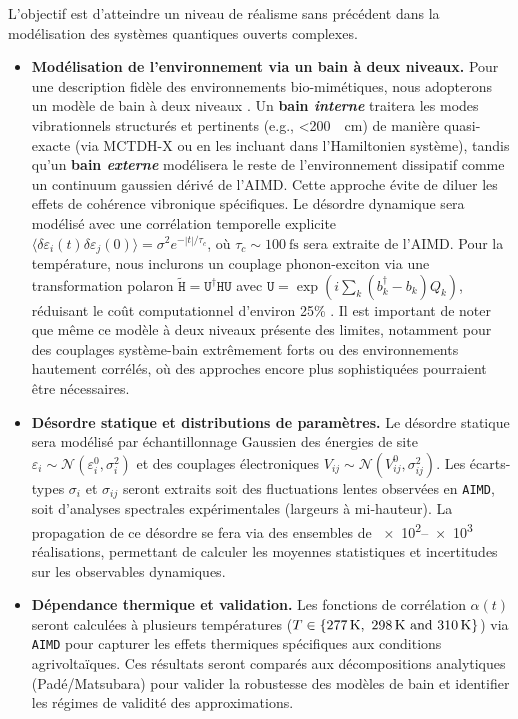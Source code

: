 \documentclass[12pt, a4paper]{article}
\begin{document}
L'objectif est d'atteindre un niveau de réalisme sans précédent dans la modélisation des systèmes quantiques ouverts complexes.
\begin{itemize}
    \item \textbf{Modélisation de l'environnement via un bain à deux niveaux.} Pour une description fidèle des environnements bio-mimétiques, nous adopterons un modèle de bain à deux niveaux \cite{Bai2024}. Un \textbf{bain \textit{interne}} traitera les modes vibrationnels structurés et pertinents (e.g., \SI{<200}{\per\centi\meter}) de manière quasi-exacte (via MCTDH-X ou en les incluant dans l'Hamiltonien système), tandis qu'un \textbf{bain \textit{externe}} modélisera le reste de l'environnement dissipatif comme un continuum gaussien dérivé de l'AIMD. Cette approche évite de diluer les effets de cohérence vibronique spécifiques. Le désordre dynamique sera modélisé avec une corrélation temporelle explicite $\langle \delta \varepsilon_i(t) \delta \varepsilon_j(0) \rangle = \sigma^2 e^{-|t|/\tau_c}$, où $\tau_c \sim \SI{100}{\femto\second}$ sera extraite de l'AIMD. Pour la température, nous inclurons un couplage phonon-exciton via une transformation polaron $\tilde{\mathtt{H}} = \mathtt{U}^\dagger \mathtt{H}\mathtt{U}$ avec $\mathtt{U} = \exp(i \sum_k (b_k^\dagger - b_k) Q_k)$, réduisant le coût computationnel d'environ 25\% \cite{Link2024}. Il est important de noter que même ce modèle à deux niveaux présente des limites, notamment pour des couplages système-bain extrêmement forts ou des environnements hautement corrélés, où des approches encore plus sophistiquées pourraient être nécessaires.
    
    \item \textbf{Désordre statique et distributions de paramètres.} Le désordre statique sera modélisé par échantillonnage Gaussien des énergies de site $\varepsilon_i \sim \mathcal{N}(\varepsilon_i^0, \sigma_i^2)$ et des couplages électroniques $V_{ij} \sim \mathcal{N}(V_{ij}^0, \sigma_{ij}^2)$. Les écarts-types $\sigma_i$ et $\sigma_{ij}$ seront extraits soit des fluctuations lentes observées en \texttt{AIMD}, soit d'analyses spectrales expérimentales (largeurs à mi-hauteur). La propagation de ce désordre se fera via des ensembles de \numrange{e2}{e3} réalisations, permettant de calculer les moyennes statistiques et incertitudes sur les observables dynamiques.
    
    \item \textbf{Dépendance thermique et validation.} Les fonctions de corrélation $\alpha(t)$ seront calculées à plusieurs températures ($T \in \{\SIlist{277; 298; 310}{\kelvin}\}$) via \texttt{AIMD} pour capturer les effets thermiques spécifiques aux conditions agrivoltaïques. Ces résultats seront comparés aux décompositions analytiques (Padé/Matsubara) pour valider la robustesse des modèles de bain et identifier les régimes de validité des approximations.
    

\end{itemize}
\end{document}
